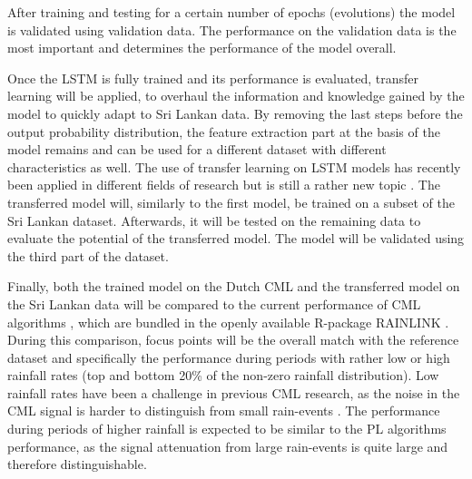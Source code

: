 \documentclass[twocolumn, 10pt, a4paper]{article}
\begin{document}
	After training and testing for a certain number of epochs (evolutions) the model is validated using validation data. The performance on the validation data is the most important and determines the performance of the model overall. 
	
	Once the LSTM is fully trained and its performance is evaluated, transfer learning will be applied, to overhaul the information and knowledge gained by the model to quickly adapt to Sri Lankan data. By removing the last steps before the output probability distribution, the feature extraction part at the basis of the model remains and can be used for a different dataset with different characteristics as well. The use of transfer learning on LSTM models has recently been applied in different fields of research but is still a rather new topic . 
	The transferred model will, similarly to the first model, be trained on a subset of the Sri Lankan dataset. Afterwards, it will be tested on the remaining data to evaluate the potential of the transferred model. The model will be validated using the third part of the dataset. 
	
	Finally, both the trained model on the Dutch CML and the transferred model on the Sri Lankan data will be compared to the current performance of CML algorithms , which are bundled in the openly available R-package RAINLINK . During this comparison, focus points will be the overall match with the reference dataset and specifically the performance during periods with rather low or high rainfall rates (top and bottom 20\% of the non-zero rainfall distribution). Low rainfall rates have been a challenge in previous CML research, as the noise in the CML signal is harder to distinguish from small rain-events . The performance during periods of higher rainfall is expected to be similar to the PL algorithms performance, as the signal attenuation from large rain-events is quite large and therefore distinguishable. 
	
\end{document}
